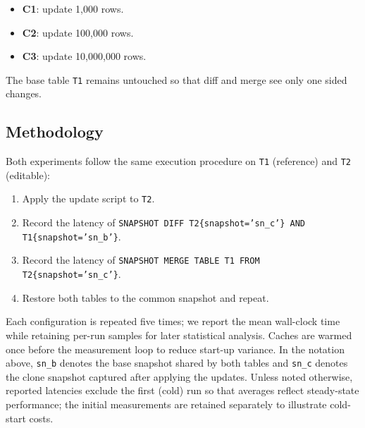 \documentclass[sigconf,nonacm]{acmart} %
\begin{document}
\begin{itemize}
\item \textbf{C1}: update 1{,}000 rows.
\item \textbf{C2}: update 100{,}000 rows.
\item \textbf{C3}: update 10{,}000{,}000 rows.
\end{itemize}

The base table \texttt{T1} remains untouched so that diff and merge see
only one sided changes.

\subsection{Methodology}
Both experiments follow the same execution procedure on \texttt{T1}
(reference) and \texttt{T2} (editable):
\begin{enumerate}
\item Apply the update script to \texttt{T2}.
\item Record the latency of \texttt{SNAPSHOT DIFF
      T2\{snapshot='sn\_c'\} AND T1\{snapshot='sn\_b'\}}.
\item Record the latency of \texttt{SNAPSHOT MERGE TABLE T1 FROM
      T2\{snapshot='sn\_c'\}}.
\item Restore both tables to the common snapshot and repeat.
\end{enumerate}
Each configuration is repeated five times; we report the mean wall-clock
time while retaining per-run samples for later statistical analysis.
Caches are warmed once before the measurement loop to reduce start-up
variance.  In the notation above, \texttt{sn\_b} denotes the base
snapshot shared by both tables and \texttt{sn\_c} denotes the clone
snapshot captured after applying the updates.  Unless noted otherwise,
reported latencies exclude the first (cold) run so that averages reflect
steady-state performance; the initial measurements are retained
separately to illustrate cold-start costs.
\end{document}
